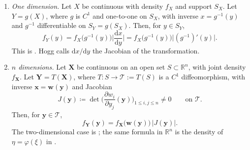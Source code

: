 \documentclass[11pt,a4paper]{article}
\begin{document}
\begin{theorem}
\label{thm:jacobian}
\begin{enumerate}[label=\textup{(\roman*)}]
    \item
    \emph{One dimension.} Let \(X\) be continuous with density \(f_X\) and support \(S_X\). Let \(Y=g(X)\), where \(g\) is \(C^{1}\) and one-to-one on \(S_X\), with inverse \(x=g^{-1}(y)\) and \(g^{-1}\) differentiable on \(S_Y=g(S_X)\). Then, for \(y\in S_Y\),
    \[
    f_Y(y)
    =
    f_X\bigl(g^{-1}(y)\bigr)
    \biggl|\frac{\mathrm{d}x}{\mathrm{d}y}\biggr|
    =
    f_X\bigl(g^{-1}(y)\bigr)
    \bigl|(g^{-1})'(y)\bigr|.
    \]
    This is \citep[Theorem~1.7.1]{hogg2019}. Hogg calls \(\mathrm{d}x/\mathrm{d}y\) the Jacobian of the transformation.
    \item
    \emph{\(n\) dimensions.} Let \(\mathbf{X}\) be continuous on an open set \(S\subset\mathbb{R}^n\), with joint density \(f_{\mathbf{X}}\). Let \(\mathbf{Y}=T(\mathbf{X})\), where \(T:S\to\mathcal{T}:=T(S)\) is a \(C^{1}\) diffeomorphism, with inverse \(\mathbf{x}=\mathbf{w}(\mathbf{y})\) and Jacobian
    \[
    J(\mathbf{y})
    \coloneqq
    \det
    \biggl(
    \frac{\partial w_i}{\partial y_j}(\mathbf{y})
    \biggr)_{1\le i,j\le n}
    \neq 0
    \qquad\text{on }\mathcal{T}.
    \]
    Then, for \(\mathbf{y}\in\mathcal{T}\),
    \[
    f_{\mathbf{Y}}(\mathbf{y})
    =
    f_{\mathbf{X}}\bigl(\mathbf{w}(\mathbf{y})\bigr)\,
    \bigl|J(\mathbf{y})\bigr|.
    \]
    The two-dimensional case is \citep[(2.2.3), \S2.2]{hogg2019}; the same formula in \(\mathbb{R}^n\) is the density of \(\eta=\varphi(\xi)\) in \citep[\S4.8, after Theorem~4.8.2]{ren2024}.
\end{enumerate}
\end{theorem}
\end{document}
